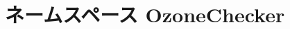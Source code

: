 \hypertarget{namespaceOzoneChecker}{
\section{ネームスペース OzoneChecker}
\label{namespaceOzoneChecker}
}
